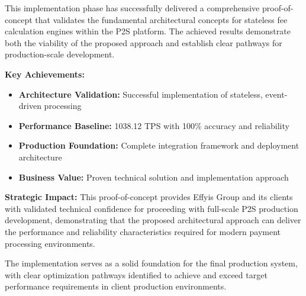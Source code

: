 This implementation phase has successfully delivered a comprehensive proof-of-concept that validates the fundamental architectural concepts for stateless fee calculation engines within the P2S platform. The achieved results demonstrate both the viability of the proposed approach and establish clear pathways for production-scale development.

\textbf{Key Achievements:}
\begin{itemize}
    \item \textbf{Architecture Validation:} Successful implementation of stateless, event-driven processing
    \item \textbf{Performance Baseline:} 1038.12 TPS with 100\% accuracy and reliability
    \item \textbf{Production Foundation:} Complete integration framework and deployment architecture
    \item \textbf{Business Value:} Proven technical solution and implementation approach
\end{itemize}

\textbf{Strategic Impact:} This proof-of-concept provides Effyis Group and its clients with validated technical confidence for proceeding with full-scale P2S production development, demonstrating that the proposed architectural approach can deliver the performance and reliability characteristics required for modern payment processing environments.

The implementation serves as a solid foundation for the final production system, with clear optimization pathways identified to achieve and exceed target performance requirements in client production environments.